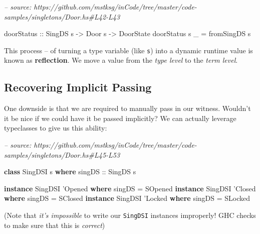 \documentclass[]{article}
\newenvironment{Shaded}{}{}
\newcommand{\CommentTok}[1]{\textcolor[rgb]{0.38,0.63,0.69}{\textit{#1}}}
\newcommand{\DataTypeTok}[1]{\textcolor[rgb]{0.56,0.13,0.00}{#1}}
\newcommand{\FunctionTok}[1]{\textcolor[rgb]{0.02,0.16,0.49}{#1}}
\newcommand{\KeywordTok}[1]{\textcolor[rgb]{0.00,0.44,0.13}{\textbf{#1}}}
\newcommand{\NormalTok}[1]{#1}
\newcommand{\OtherTok}[1]{\textcolor[rgb]{0.00,0.44,0.13}{#1}}
\begin{document}
\begin{Shaded}
\begin{Highlighting}[]
\CommentTok{-- source: https://github.com/mstksg/inCode/tree/master/code-samples/singletons/Door.hs#L42-L43}

\OtherTok{doorStatus ::} \DataTypeTok{SingDS}\NormalTok{ s }\OtherTok{->} \DataTypeTok{Door}\NormalTok{ s }\OtherTok{->} \DataTypeTok{DoorState}
\NormalTok{doorStatus s _ }\FunctionTok{=}\NormalTok{ fromSingDS s}
\end{Highlighting}
\end{Shaded}

This process -- of turning a type variable (like \texttt{s}) into a dynamic
runtime value is known as \textbf{reflection}. We move a value from the
\emph{type level} to the \emph{term level}.

\hypertarget{recovering-implicit-passing}{%
\subsection{Recovering Implicit Passing}\label{recovering-implicit-passing}}

One downside is that we are required to manually pass in our witness. Wouldn't
it be nice if we could have it be passed implicitly? We can actually leverage
typeclasses to give us this ability:

\begin{Shaded}
\begin{Highlighting}[]
\CommentTok{-- source: https://github.com/mstksg/inCode/tree/master/code-samples/singletons/Door.hs#L45-L53}

\KeywordTok{class} \DataTypeTok{SingDSI}\NormalTok{ s }\KeywordTok{where}
\OtherTok{    singDS ::} \DataTypeTok{SingDS}\NormalTok{ s}

\KeywordTok{instance} \DataTypeTok{SingDSI}\NormalTok{ '}\DataTypeTok{Opened} \KeywordTok{where}
\NormalTok{    singDS }\FunctionTok{=} \DataTypeTok{SOpened}
\KeywordTok{instance} \DataTypeTok{SingDSI}\NormalTok{ '}\DataTypeTok{Closed} \KeywordTok{where}
\NormalTok{    singDS }\FunctionTok{=} \DataTypeTok{SClosed}
\KeywordTok{instance} \DataTypeTok{SingDSI}\NormalTok{ '}\DataTypeTok{Locked} \KeywordTok{where}
\NormalTok{    singDS }\FunctionTok{=} \DataTypeTok{SLocked}
\end{Highlighting}
\end{Shaded}

(Note that \emph{it's impossible} to write our \texttt{SingDSI} instances
improperly! GHC checks to make sure that this is \emph{correct})
\end{document}
